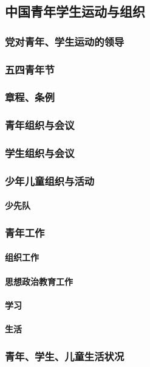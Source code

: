 \documentclass[UTF8]{../RepresentationUniverse}
\begin{document}
\subsection{中国青年学生运动与组织}
    \subsubsection{党对青年、学生运动的领导}
    \subsubsection{五四青年节}
    \subsubsection{章程、条例}
    \subsubsection{青年组织与会议}
    \subsubsection{学生组织与会议}
    \subsubsection{少年儿童组织与活动}
        \paragraph{少先队}

    \subsubsection{青年工作}
        \paragraph{组织工作}
        \paragraph{思想政治教育工作}
        \paragraph{学习}
        \paragraph{生活}

    \subsubsection{青年、学生、儿童生活状况}
\end{document}
